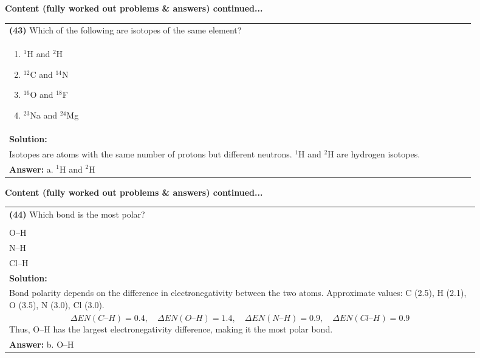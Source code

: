 \documentclass{article}
\begin{document}
\noindent
{\large\textbf{Content (fully worked out problems \& answers) continued...}}\\[0.2em]
\vspace{0.2cm}
\begin{tabular}{|p{0.9\linewidth}|}
\hline
\vspace{0.2cm}
\textbf{(43)} Which of the following are isotopes of the same element? \\
\begin{minipage}[t]{0.85\linewidth}
\begin{enumerate}[label=\alph*.]
\item $^{1}$H and $^{2}$H
\item $^{12}$C and $^{14}$N
\item $^{16}$O and $^{18}$F
\item $^{23}$Na and $^{24}$Mg
\end{enumerate}
\end{minipage}\\
\hline
\vspace{0.2cm}
\textbf{Solution:} \\
Isotopes are atoms with the same number of protons but different neutrons. $^{1}$H and $^{2}$H are hydrogen isotopes. \\
\hline
\vspace{0.2cm}
\textbf{Answer:} a. $^{1}$H and $^{2}$H \\
\hline
\end{tabular}
\newpage
\noindent
{\large\textbf{Content (fully worked out problems \& answers) continued...}}\\[0.2em]
\vspace{0.2cm}
\begin{tabular}{|p{0.9\linewidth}|}
\hline
\vspace{0.2cm}
\textbf{(44)} Which bond is the most polar? \\
\begin{minipage}[t]{0.85\linewidth}
\begin{enumerate}[label=\alph*.]
\item C–H \\
\item O–H \\
\item N–H \\
\item Cl–H
\end{enumerate}
\end{minipage}\\
\hline
\vspace{0.2cm}
\textbf{Solution:} \\
Bond polarity depends on the difference in electronegativity between the two atoms. Approximate values: C (2.5), H (2.1), O (3.5), N (3.0), Cl (3.0). \\
\[
\Delta EN(C–H) = 0.4, \quad \Delta EN(O–H) = 1.4, \quad \Delta EN(N–H) = 0.9, \quad \Delta EN(Cl–H) = 0.9
\]  
Thus, O–H has the largest electronegativity difference, making it the most polar bond. \\
\hline
\vspace{0.2cm}
\textbf{Answer:} b. O–H \\
\hline
\end{tabular}
\newpage
\end{document}
